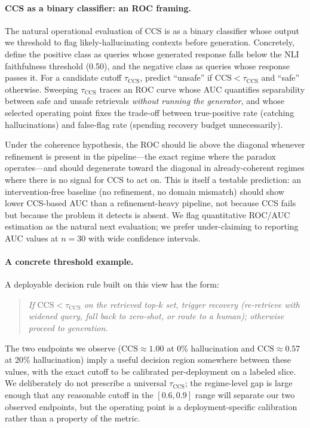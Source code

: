 \paragraph{CCS as a binary classifier: an ROC framing.}
The natural operational evaluation of CCS is as a binary classifier whose
output we threshold to flag likely-hallucinating contexts before
generation. Concretely, define the positive class as queries whose
generated response falls below the NLI faithfulness threshold (0.50),
and the negative class as queries whose response passes it. For a
candidate cutoff $\tau_{\text{CCS}}$, predict ``unsafe'' if
$\text{CCS} < \tau_{\text{CCS}}$ and ``safe'' otherwise. Sweeping
$\tau_{\text{CCS}}$ traces an ROC curve whose AUC quantifies separability
between safe and unsafe retrievals \emph{without running the generator},
and whose selected operating point fixes the trade-off between
true-positive rate (catching hallucinations) and false-flag rate
(spending recovery budget unnecessarily).

Under the coherence hypothesis, the ROC should lie above the diagonal
whenever refinement is present in the pipeline---the exact regime where
the paradox operates---and should degenerate toward the diagonal in
already-coherent regimes where there is no signal for CCS to act on.
This is itself a testable prediction: an intervention-free baseline (no
refinement, no domain mismatch) should show lower CCS-based AUC than a
refinement-heavy pipeline, not because CCS fails but because the problem
it detects is absent. We flag quantitative ROC/AUC estimation as the
natural next evaluation; we prefer under-claiming to reporting AUC values
at $n{=}30$ with wide confidence intervals.

\paragraph{A concrete threshold example.}
A deployable decision rule built on this view has the form:
\begin{quote}
\emph{If $\text{CCS} < \tau_{\text{CCS}}$ on the retrieved top-$k$ set,
trigger recovery (re-retrieve with widened query, fall back to zero-shot,
or route to a human); otherwise proceed to generation.}
\end{quote}
The two endpoints we observe ($\text{CCS}{\approx}1.00$ at 0\%
hallucination and $\text{CCS}{\approx}0.57$ at 20\% hallucination) imply a
useful decision region somewhere between these values, with the exact
cutoff to be calibrated per-deployment on a labeled slice. We
deliberately do not prescribe a universal $\tau_{\text{CCS}}$; the
regime-level gap is large enough that any reasonable cutoff in the
$[0.6, 0.9]$ range will separate our two observed endpoints, but the
operating point is a deployment-specific calibration rather than a
property of the metric.


